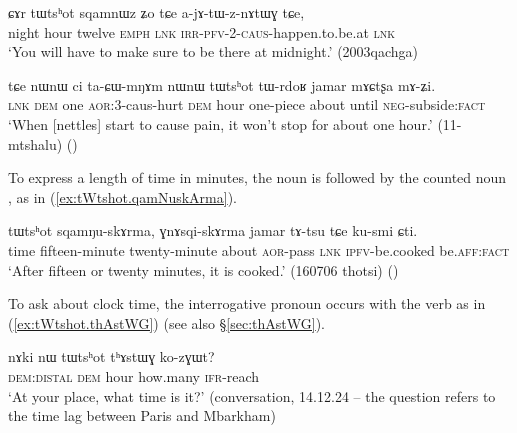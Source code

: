 \begin{exe}
\ex \label{ex:tWtshot.sqamnWz}
\gll ɕɤr tɯtsʰot sqamnɯz ʑo tɕe a-jɤ-tɯ-z-nɤtɯɣ tɕe, \\
 night hour twelve \textsc{emph} \textsc{lnk}  \textsc{irr}-\textsc{pfv}-2-\textsc{caus}-happen.to.be.at \textsc{lnk} \\
\glt `You will have to make sure to be there at midnight.' (2003qachga)
\end{exe}
 
\begin{exe}
\ex \label{ex:tWtshot.tWrdoR}
\gll  tɕe nɯnɯ ci ta-ɕɯ-mŋɤm nɯnɯ tɯtsʰot tɯ-rdoʁ jamar mɤɕtʂa mɤ-ʑi. \\
 \textsc{lnk} \textsc{dem} one \textsc{aor}:3\flobv{}-caus-hurt \textsc{dem} hour one-piece about until \textsc{neg}-subside:\textsc{fact} \\
\glt `When [nettles] start to cause pain, it won't stop for about one hour.' (11-mtshalu) ()
\end{exe}

To express a length of time in minutes, the noun    is followed by the counted noun , as in (\ref{ex:tWtshot.qamNuskArma}).
  
\begin{exe}
\ex \label{ex:tWtshot.qamNuskArma}
\gll  tɯtsʰot sqamŋu-skɤrma, ɣnɤsqi-skɤrma jamar tɤ-tsu tɕe ku-smi ɕti. \\
 time fifteen-minute twenty-minute about \textsc{aor}-pass \textsc{lnk} \textsc{ipfv}-be.cooked be.\textsc{aff}:\textsc{fact} \\
\glt `After fifteen or twenty minutes, it is cooked.' (160706 thotsi)
()
\end{exe}

To ask about clock time, the interrogative pronoun  occurs with the verb  as in (\ref{ex:tWtshot.thAstWG}) (see also §\ref{sec:thAstWG}).

\begin{exe}
\ex \label{ex:tWtshot.thAstWG}
\gll     nɤki nɯ tɯtsʰot tʰɤstɯɣ ko-zɣɯt? \\
 \textsc{dem}:\textsc{distal} \textsc{dem} hour how.many \textsc{ifr}-reach \\
\glt  `At your place, what time is it?' (conversation, 14.12.24 -- the question refers to the time lag between Paris and Mbarkham)
\end{exe}
    
